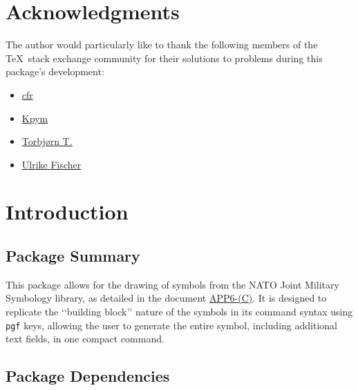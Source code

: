 \documentclass[a4paper, titlepage]{article}
\begin{document}
\clearpage

\begin{versionhistory}
\renewcommand \vhAuthorColWidth{6cm}
\end{versionhistory}

\clearpage

\section*{Acknowledgments}

The author would particularly like to thank the following members of the \TeX\  stack exchange community for their solutions to problems during this package\rq{}s development:

\begin{itemize}
\item \href{https://tex.stackexchange.com/users/39222}{cfr}
\item \href{https://tex.stackexchange.com/users/9335}{Kpym}
\item \href{https://tex.stackexchange.com/users/586}{Torbj\o rn T.}
\item \href{https://tex.stackexchange.com/users/2388}{Ulrike Fischer}
\end{itemize}

\clearpage

\tableofcontents

\clearpage

\section{Introduction}

\subsection{Package Summary}

This package allows for the drawing of symbols from the NATO Joint Military Symbology library, as detailed in the document \href{https://www.awl.edu.pl/images/en/APP_6_C.pdf}{APP6-(C)}. It is designed to replicate the \lq\lq{}building block\rq\rq{} nature of the symbols in its command syntax using \texttt{pgf} keys, allowing the user to generate the entire symbol, including additional text fields, in one compact command.

\subsection{Package Dependencies}
\end{document}

